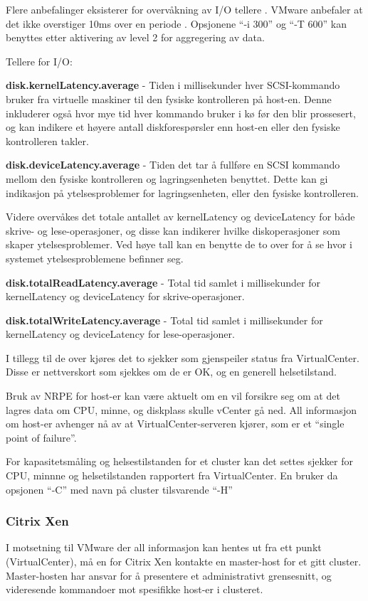 Flere anbefalinger eksisterer for overvåkning av I/O tellere \cite{solarwindsio, vmwareiobasics}. VMware anbefaler at det ikke overstiger 10ms over en periode \cite{vmwareiotresh}. Opsjonene ``-i 300'' og ``-T 600'' kan benyttes etter aktivering av level 2 for aggregering av data.

Tellere for I/O:

{\bf disk.kernelLatency.average} - Tiden i millisekunder hver SCSI-kommando bruker fra virtuelle maskiner til den fysiske kontrolleren på host-en. Denne inkluderer også hvor mye tid hver kommando bruker i kø før den blir prossesert, og kan indikere et høyere antall diskforespørsler enn host-en eller den fysiske kontrolleren takler.
 
{\bf disk.deviceLatency.average} - Tiden det tar å fullføre en SCSI kommando mellom den fysiske kontrolleren og lagringsenheten benyttet. Dette kan gi indikasjon på ytelsesproblemer for lagringsenheten, eller den fysiske kontrolleren. 

Videre overvåkes det totale antallet av kernelLatency og deviceLatency for både skrive- og lese-operasjoner, og disse kan indikerer hvilke diskoperasjoner som skaper ytelsesproblemer. Ved høye tall kan en benytte de to over for å se hvor i systemet ytelsesproblemene befinner seg. 

{\bf disk.totalReadLatency.average} - Total tid samlet i millisekunder for kernelLatency og deviceLatency for skrive-operasjoner. 

{\bf disk.totalWriteLatency.average} - Total tid samlet i millisekunder for kernelLatency og deviceLatency for lese-operasjoner.

I tillegg til de over kjøres det to sjekker som gjenspeiler status fra VirtualCenter. Disse er nettverskort som sjekkes om de er OK, og en generell helsetilstand. 

Bruk av NRPE for host-er kan være aktuelt om en vil forsikre seg om at det lagres data om CPU, minne, og diskplass skulle vCenter gå ned. All informasjon om host-er avhenger nå av at VirtualCenter-serveren kjører, som er et ``single point of failure''.

For kapasitetsmåling og helsestilstanden for et cluster kan det settes sjekker for CPU, minnne og helsetilstanden rapportert fra VirtualCenter. En bruker da opsjonen ``-C'' med navn på cluster tilsvarende ``-H''

\subsubsection{Citrix Xen}
I motsetning til VMware der all informasjon kan hentes ut fra ett punkt (VirtualCenter), må en for Citrix Xen kontakte en master-host for et gitt cluster. Master-hosten har ansvar for å presentere et administrativt grensesnitt, og videresende kommandoer mot spesifikke host-er i clusteret.

